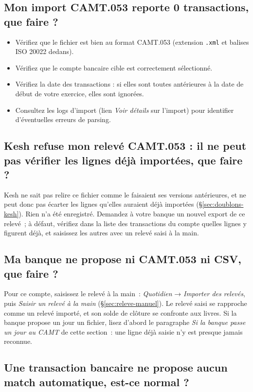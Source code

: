 \documentclass[a4paper,11pt,oneside]{article}
\begin{document}
\subsection{Mon import CAMT.053 reporte 0 transactions, que faire ?}

\begin{itemize}
    \item Vérifiez que le fichier est bien au format CAMT.053 (extension \texttt{.xml} et balises ISO 20022 dedans).
    \item Vérifiez que le compte bancaire cible est correctement sélectionné.
    \item Vérifiez la date des transactions : si elles sont toutes antérieures à la date de début de votre exercice, elles sont ignorées.
    \item Consultez les logs d'import (lien \emph{Voir détails} sur l'import) pour identifier d'éventuelles erreurs de parsing.
\end{itemize}

\subsection{Kesh refuse mon relevé CAMT.053 : il ne peut pas vérifier les lignes déjà importées, que faire ?}

Kesh ne sait pas relire ce fichier comme le faisaient ses versions antérieures, et ne peut donc pas écarter les lignes qu'elles auraient déjà importées (\S\ref{sec:doublons-kesh}). Rien n'a été enregistré. Demandez à votre banque un nouvel export de ce relevé~; à défaut, vérifiez dans la liste des transactions du compte quelles lignes y figurent déjà, et saisissez les autres avec un relevé saisi à la main.

\subsection{Ma banque ne propose ni CAMT.053 ni CSV, que faire ?}

Pour ce compte, saisissez le relevé à la main~: \emph{Quotidien} → \emph{Importer des relevés},
puis \emph{Saisir un relevé à la main} (\S\ref{sec:releve-manuel}). Le relevé saisi se rapproche
comme un relevé importé, et son solde de clôture se confronte aux livres. Si la banque propose
un jour un fichier, lisez d'abord le paragraphe \emph{Si la banque passe un jour au CAMT} de
cette section~: une ligne déjà saisie n'y est presque jamais reconnue.

\subsection{Une transaction bancaire ne propose aucun match automatique, est-ce normal ?}\label{sec:faq-aucun-match}
\end{document}
